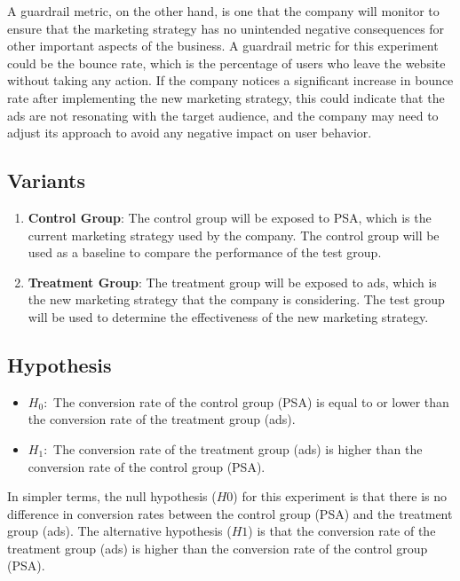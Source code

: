 \documentclass{article}
\begin{document}
A guardrail metric, on the other hand, is one that the company will monitor to ensure that the marketing strategy has no unintended negative consequences for other important aspects of the business. A guardrail metric for this experiment could be the bounce rate, which is the percentage of users who leave the website without taking any action. If the company notices a significant increase in bounce rate after implementing the new marketing strategy, this could indicate that the ads are not resonating with the target audience, and the company may need to adjust its approach to avoid any negative impact on user behavior. 

\subsection*{Variants} 

\begin{enumerate}
    \item \textbf{Control Group}: The control group will be exposed to PSA, which is the current marketing strategy used by the company. The control group will be used as a baseline to compare the performance of the test group.
    \item \textbf{Treatment Group}: The treatment group will be exposed to ads, which is the new marketing strategy that the company is considering. The test group will be used to determine the effectiveness of the new marketing strategy.
\end{enumerate}

\subsection*{Hypothesis} 

\begin{itemize}
    \item $H_0:$ The conversion rate of the control group (PSA) is equal to or lower than the conversion rate of the treatment group (ads).
    \item $H_1:$ The conversion rate of the treatment group (ads) is higher than the conversion rate of the control group (PSA).
\end{itemize}

In simpler terms, the null hypothesis ($H 0$) for this experiment is that there is no difference in conversion rates between the control group (PSA) and the treatment group (ads). The alternative hypothesis ($H 1$) is that the conversion rate of the treatment group (ads) is higher than the conversion rate of the control group (PSA). 
\end{document}
